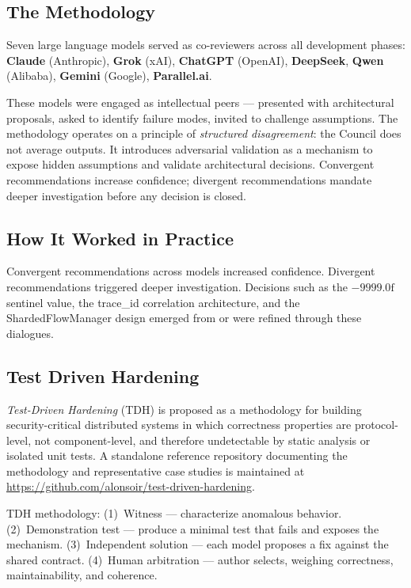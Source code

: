 \documentclass[11pt,a4paper]{article}
\begin{document}
    \subsection{The Methodology}

    Seven large language models served as co-reviewers across all development phases:
    \textbf{Claude} (Anthropic), \textbf{Grok} (xAI), \textbf{ChatGPT} (OpenAI),
    \textbf{DeepSeek}, \textbf{Qwen} (Alibaba), \textbf{Gemini} (Google), \textbf{Parallel.ai}.

    These models were engaged as intellectual peers --- presented with architectural proposals,
    asked to identify failure modes, invited to challenge assumptions. The methodology operates
    on a principle of \emph{structured disagreement}: the Council does not average outputs.
    It introduces adversarial validation as a mechanism to expose hidden assumptions and
    validate architectural decisions. Convergent recommendations increase confidence; divergent
    recommendations mandate deeper investigation before any decision is closed.

    \subsection{How It Worked in Practice}

    Convergent recommendations across models increased confidence. Divergent recommendations
    triggered deeper investigation. Decisions such as the $-9999.0\text{f}$ sentinel value, the
    trace\_id correlation architecture, and the ShardedFlowManager design emerged from or were
    refined through these dialogues.

    \subsection{Test Driven Hardening}
    \label{subsec:tdh}

    \emph{Test-Driven Hardening} (TDH) is proposed as a methodology for building
    security-critical distributed systems in which correctness properties are protocol-level,
    not component-level, and therefore undetectable by static analysis or isolated unit tests.
    A standalone reference repository documenting the methodology and representative case studies
    is maintained at \url{https://github.com/alonsoir/test-driven-hardening}.

    TDH methodology: (1)~Witness --- characterize anomalous behavior. (2)~Demonstration test ---
    produce a minimal test that fails and exposes the mechanism. (3)~Independent solution ---
    each model proposes a fix against the shared contract. (4)~Human arbitration --- author
    selects, weighing correctness, maintainability, and coherence.
\end{document}

